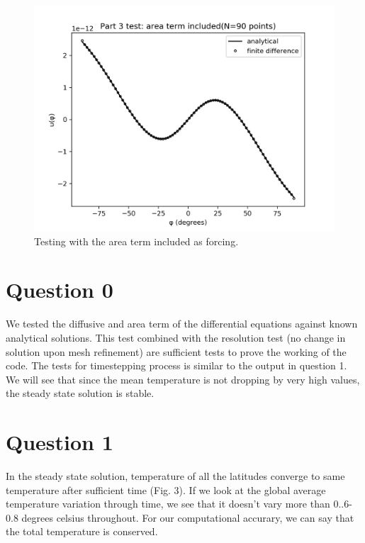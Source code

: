 \documentclass{article}
\begin{document}
\begin{figure}
\includegraphics[scale=0.6]{part3.png}
\caption{Testing with the area term included as forcing.}
\end{figure}


\section*{Question 0}
We tested the diffusive and area term of the differential equations against known analytical solutions. This test combined with the resolution test (no change in solution upon mesh refinement) are sufficient tests to prove the working of the code. The tests for timestepping process is similar to the output in question 1. We will see that since the mean temperature is not dropping by very high values, the steady state solution is stable.


\section*{Question 1}
In the steady state solution, temperature of all the latitudes converge to same temperature after sufficient time (Fig. 3). If we look at the global average temperature variation through time, we see that it doesn't vary more than 0..6-0.8 degrees celsius throughout. For our computational accurary, we can say that the total temperature is conserved.
\end{document}
